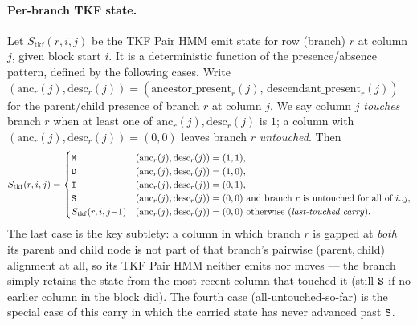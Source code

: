 \paragraph{Per-branch TKF state.}
Let $S_{\mathrm{tkf}}(r, i, j)$ be the TKF Pair HMM emit state for
row (branch) $r$ at column $j$, given block start $i$. It is a
deterministic function of the presence/absence pattern, defined by the
following cases. Write
$(\text{anc}_r(j),\text{desc}_r(j)) =
(\text{ancestor\_present}_r(j),\,\text{descendant\_present}_r(j))$
for the parent/child presence of branch $r$ at column $j$. We say
column $j$ \emph{touches} branch $r$ when at least one of
$\text{anc}_r(j),\text{desc}_r(j)$ is $1$; a column with
$(\text{anc}_r(j),\text{desc}_r(j))=(0,0)$ leaves branch $r$
\emph{untouched}. Then
\[
  S_{\mathrm{tkf}}(r, i, j) =
  \begin{cases}
    {\tt M} & (\text{anc}_r(j),\text{desc}_r(j)) = (1,1), \\
    {\tt D} & (\text{anc}_r(j),\text{desc}_r(j)) = (1,0), \\
    {\tt I} & (\text{anc}_r(j),\text{desc}_r(j)) = (0,1), \\
    {\tt S} & (\text{anc}_r(j),\text{desc}_r(j)) = (0,0)\ \text{and branch
           $r$ is untouched for all of } i..j, \\
    S_{\mathrm{tkf}}(r, i, j{-}1) & (\text{anc}_r(j),\text{desc}_r(j)) = (0,0)\ \text{otherwise
           (\emph{last-touched carry}).}
  \end{cases}
\]
The last case is the key subtlety: a column in which branch $r$ is gapped
at \emph{both} its parent and child node is not part of that branch's
pairwise (parent,\,child) alignment at all, so its TKF Pair HMM neither
emits nor moves --- the branch simply retains the state from the most
recent column that touched it (still ${\tt S}$ if no earlier column in the
block did). The fourth case (all-untouched-so-far) is the special case of
this carry in which the carried state has never advanced past ${\tt S}$.

